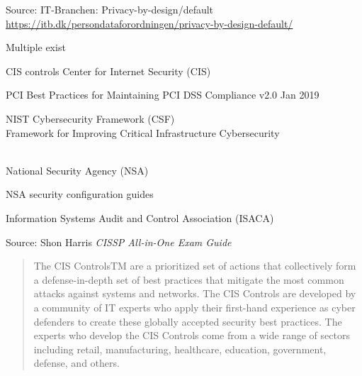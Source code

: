 \documentclass[Screen16to9,17pt]{foils}
\begin{document}
Source: IT-Branchen: Privacy-by-design/default\\ \url{https://itb.dk/persondataforordningen/privacy-by-design-default/}



\begin{list1}
\item Multiple exist
\vskip 1cm
\begin{list2}
\item CIS controls Center for Internet Security (CIS) 
\item PCI Best Practices for Maintaining PCI DSS Compliance v2.0 Jan 2019
\item NIST Cybersecurity Framework (CSF)\\
Framework for Improving
Critical Infrastructure Cybersecurity\\ \\
\item National Security Agency (NSA)\\ 
\item NSA security configuration guides\\ 
\item Information Systems Audit and Control Association (ISACA)\\
\end{list2}
\end{list1}




Source: Shon Harris \emph{CISSP All-in-One Exam Guide}



\begin{quote}
  The CIS ControlsTM are a prioritized set of actions that collectively form a defense-in-depth set
of best practices that mitigate the most common attacks against systems and networks. The
CIS Controls are developed by a community of IT experts who apply their first-hand experience
as cyber defenders to create these globally accepted security best practices. The experts who
develop the CIS Controls come from a wide range of sectors including retail, manufacturing,
healthcare, education, government, defense, and others.
\end{quote}
\end{document}
